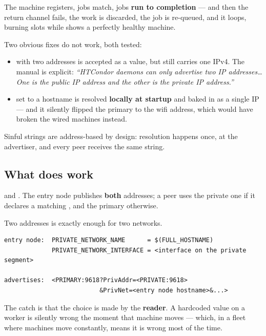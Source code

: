 \begin{trap}
The machine registers, jobs match, jobs \textbf{run to completion} --- and then
the return channel fails, the work is discarded, the job is re-queued, and it
loops, burning slots while  shows a perfectly healthy machine.
\end{trap}

Two obvious fixes do not work, both tested:

\begin{itemize}
  \item {} with two addresses is accepted as a value, but
         still carries one IPv4. The manual is explicit: \emph{``HTCondor
        daemons can only advertise two IP addresses\ldots One is the public IP
        address and the other is the private IP address.''}
  \item {} set to a hostname is resolved \textbf{locally
        at startup} and baked in as a single IP --- and it silently flipped the
        primary to the wifi address, which would have broken the wired machines
        instead.
\end{itemize}

Sinful strings are address-based by design: resolution happens once, at the
advertiser, and every peer receives the same string.

\subsection{What does work}

 and . The entry node
publishes \textbf{both} addresses; a peer uses the private one if it declares a
matching , and the primary otherwise.

Two addresses is exactly enough for two networks.

\begin{lstlisting}
entry node:  PRIVATE_NETWORK_NAME      = $(FULL_HOSTNAME)
             PRIVATE_NETWORK_INTERFACE = <interface on the private segment>

advertises:  <PRIMARY:9618?PrivAddr=<PRIVATE:9618>
                          &PrivNet=<entry node hostname>&...>
\end{lstlisting}

The catch is that the choice is made by the \textbf{reader}. A hardcoded value on
a worker is silently wrong the moment that machine moves --- which, in a fleet
where machines move constantly, means it is wrong most of the time.

